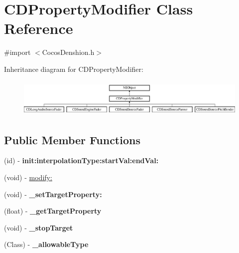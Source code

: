\hypertarget{interface_c_d_property_modifier}{\section{C\-D\-Property\-Modifier Class Reference}
\label{interface_c_d_property_modifier}
}


{\ttfamily \#import $<$Cocos\-Denshion.\-h$>$}

Inheritance diagram for C\-D\-Property\-Modifier\-:\begin{figure}[H]
\begin{center}
\leavevmode
\includegraphics[height=1.826087cm]{interface_c_d_property_modifier}
\end{center}
\end{figure}
\subsection*{Public Member Functions}
\begin{DoxyCompactItemize}
\item 
\hypertarget{interface_c_d_property_modifier_a3fb9bdcf5457aae6a97e40a29623ecc1}{(id) -\/ {\bfseries init\-:interpolation\-Type\-:start\-Val\-:end\-Val\-:}}\label{interface_c_d_property_modifier_a3fb9bdcf5457aae6a97e40a29623ecc1}

\item 
(void) -\/ \hyperlink{interface_c_d_property_modifier_a8c2d8d098bc743ad13d80271a03f15d6}{modify\-:}
\item 
\hypertarget{interface_c_d_property_modifier_ab5661c86cd671b7393e7012d0e08a355}{(void) -\/ {\bfseries \-\_\-set\-Target\-Property\-:}}\label{interface_c_d_property_modifier_ab5661c86cd671b7393e7012d0e08a355}

\item 
\hypertarget{interface_c_d_property_modifier_a9aab6ce1e0e21603340230375fb8133e}{(float) -\/ {\bfseries \-\_\-get\-Target\-Property}}\label{interface_c_d_property_modifier_a9aab6ce1e0e21603340230375fb8133e}

\item 
\hypertarget{interface_c_d_property_modifier_ad4db2857a169bb8abf15b1596a5407de}{(void) -\/ {\bfseries \-\_\-stop\-Target}}\label{interface_c_d_property_modifier_ad4db2857a169bb8abf15b1596a5407de}

\item 
\hypertarget{interface_c_d_property_modifier_a8f4ee3a547824a5d2045bfbd7ed5474e}{(Class) -\/ {\bfseries \-\_\-allowable\-Type}}\label{interface_c_d_property_modifier_a8f4ee3a547824a5d2045bfbd7ed5474e}

\end{DoxyCompactItemize}
